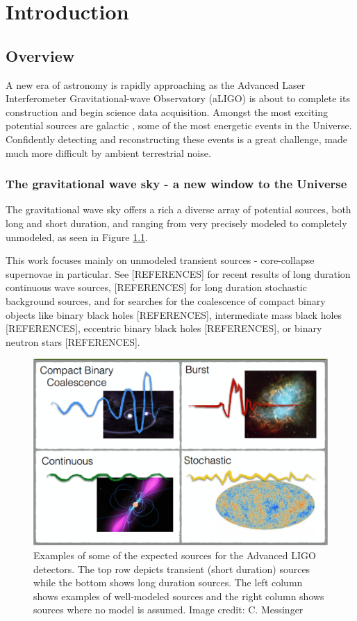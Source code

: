\chapter{Introduction }



\section{Overview}

A new era of \gw{}  astronomy is rapidly approaching as the Advanced Laser Interferometer Gravitational-wave Observatory (aLIGO) is about to complete its construction and begin science data acquisition. Amongst the most exciting potential sources are galactic \sn{}, some of the most energetic events in the Universe. Confidently detecting and reconstructing these events is a great challenge, made much more difficult by ambient terrestrial noise. 

\subsection{The gravitational wave sky - a new window to the Universe}


The gravitational wave sky offers a rich a diverse array of potential sources, both long and short duration, and ranging from very precisely modeled to completely unmodeled, as seen in Figure \ref{fig:sources}. 


This work focuses mainly on unmodeled transient sources - core-collapse supernovae in particular. See [REFERENCES] for recent results of long duration continuous wave sources, [REFERENCES] for long duration stochastic background sources, and for searches for the coalescence of compact binary objects like binary black holes [REFERENCES], intermediate mass black holes [REFERENCES], eccentric binary black holes [REFERENCES], or binary neutron stars [REFERENCES].  

\begin{figure}
\includegraphics[scale=0.6]{figures/aLIGO_sources.png}
\caption{Examples of some of the expected \gw{} sources for the Advanced LIGO detectors. The top row depicts transient (short duration) sources while the bottom shows long duration sources. The left column shows examples of well-modeled sources and the right column shows sources where no \gw{} model is assumed. Image credit: C. Messinger}
\label{fig:sources}
\end{figure}

